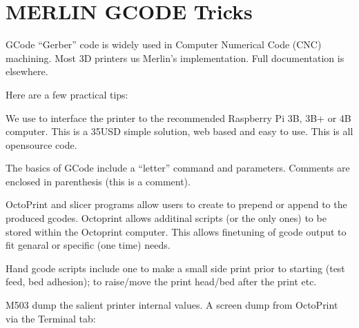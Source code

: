 \documentclass[letterpaper,10pt,english,openany,oneside]{sphinxmanual}
\begin{document}
\chapter{MERLIN GCODE Tricks}
\label{\detokenize{merlin:merlin-gcode-tricks}}\label{\detokenize{merlin::doc}}
\sphinxAtStartPar
GCode “Gerber” code is widely used in Computer Numerical Code (CNC) machining.
Most 3D printers us Merlin’s implementation. Full documentation is elsewhere.

\sphinxAtStartPar
Here are a few practical tips:

\sphinxAtStartPar
We use  to interface the printer
to the recommended Raspberry Pi 3B, 3B+ or 4B computer. This is a
35USD simple solution, web based and easy to use. This is all open\sphinxhyphen{}source
code.

\sphinxAtStartPar
The basics of GCode include a “letter” command and parameters.
Comments are enclosed in parenthesis (this is a comment).

\sphinxAtStartPar
OctoPrint and slicer programs allow users to create  to prepend
or append to the produced gcodes. Octoprint allows additinal scripts
(or the only ones) to be stored within the Octoprint computer. This
allows fine\sphinxhyphen{}tuning of gcode output to fit genaral or specific (one time)
needs.

\sphinxAtStartPar
Hand gcode scripts include one to make a small side print prior to
starting (test feed, bed adhesion); to raise/move the print head/bed
after the print \textendash{} etc.

\sphinxAtStartPar
M503 \sphinxhyphen{} dump the salient printer internal values. A screen dump from
OctoPrint via the Terminal tab:
\end{document}
